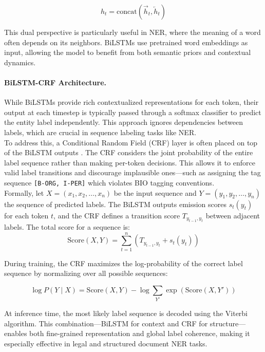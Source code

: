 \documentclass{article}
\begin{document}
\[
h_t = \text{concat}(\overrightarrow{h}_t, \overleftarrow{h}_t)
\]

This dual perspective is particularly useful in NER, where the meaning of a word often depends on its neighbors. BiLSTMs use pretrained word embeddings as input, allowing the model to benefit from both semantic priors and contextual dynamics.

\paragraph{BiLSTM-CRF Architecture.}
While BiLSTMs provide rich contextualized representations for each token, their output at each timestep is typically passed through a softmax classifier to predict the entity label independently. This approach ignores dependencies between labels, which are crucial in sequence labeling tasks like NER. \\

To address this, a Conditional Random Field (CRF) layer is often placed on top of the BiLSTM outputs \cite{lample2016neural}. The CRF considers the joint probability of the entire label sequence rather than making per-token decisions. This allows it to enforce valid label transitions and discourage implausible ones—such as assigning the tag sequence \texttt{[B-ORG, I-PER]} which violates BIO tagging conventions. \\

Formally, let $X = (x_1, x_2, \dots, x_n)$ be the input sequence and $Y = (y_1, y_2, \dots, y_n)$ the sequence of predicted labels. The BiLSTM outputs emission scores $s_t(y_t)$ for each token $t$, and the CRF defines a transition score $T_{y_{t-1}, y_t}$ between adjacent labels. The total score for a sequence is: \\

\[
\text{Score}(X, Y) = \sum_{t=1}^{n} \left( T_{y_{t-1}, y_t} + s_t(y_t) \right)
\]

During training, the CRF maximizes the log-probability of the correct label sequence by normalizing over all possible sequences:

\[
\log P(Y \mid X) = \text{Score}(X, Y) - \log \sum_{Y'} \exp(\text{Score}(X, Y'))
\]

At inference time, the most likely label sequence is decoded using the Viterbi algorithm. This combination—BiLSTM for context and CRF for structure—enables both fine-grained representation and global label coherence, making it especially effective in legal and structured document NER tasks. \\
\end{document}
